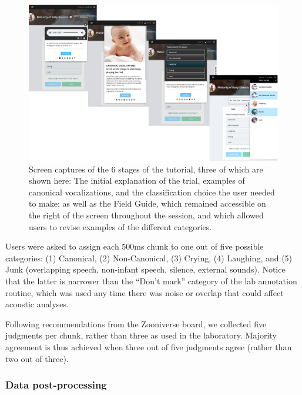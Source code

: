 \documentclass[english,,man]{apa6}
\begin{document}
\begin{figure}
\centering
\includegraphics{zooniverse-pufig.pdf}
\caption{\label{fig:fig-zoo}Screen captures of the 6 stages of the tutorial, three of which are shown here: The initial explanation of the trial, examples of canonical vocalizations, and the classification choice the user needed to make; as well as the Field Guide, which remained accessible on the right of the screen throughout the session, and which allowed users to revise examples of the different categories.}
\end{figure}

Users were asked to assign each 500ms chunk to one out of five possible categories: (1) Canonical, (2) Non-Canonical, (3) Crying, (4) Laughing, and (5) Junk (overlapping speech, non-infant speech, silence, external sounds). Notice that the latter is narrower than the \enquote{Don't mark} category of the lab annotation routine, which was used any time there was noise or overlap that could affect acoustic analyses.

Following recommendations from the Zooniverse board, we collected five judgments per chunk, rather than three as used in the laboratory. Majority agreement is thus achieved when three out of five judgments agree (rather than two out of three).

\hypertarget{data-post-processing}{%
\subsubsection{Data post-processing}\label{data-post-processing}}
\end{document}
